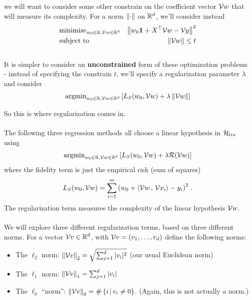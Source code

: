     we will want to consider some other constrain on the coefficient vector
    $\mathcal{V}{w}$ that will measure its complexity. For a norm $\left\| \cdot\right\|$ on
    $\mathbb{R}^d$, we'll consider instead 
    \begin{eqnarray*}
  & \text{minimize}_{w_0\in\mathbb{R},\mathcal{V}{w}\in\mathbb{R}^{d}}   &  \left\|   w_0\mathbf{1} + X^{\top}\mathcal{V}{w} -\mathcal{V}{y}  \right\|^2 \\
      & \text{subject to} &  \left\| \mathcal{V}{w}\right\| \leq t
    \end{eqnarray*}
~\\
    It is simpler to consider an {\bf unconstrained}  form of these optimization
    problems - instead of specifying the constrain $t$, we'll specify a
    regularization parameter $\lambda$ and consider
\[
     \text{argmin}_{w_0\in\mathbb{R},\mathcal{V}{w}\in\mathbb{R}^{d}} \left[L_S(w_0,\mathcal{V}{w})+  \lambda
     \left\| \mathcal{V}{w}\right\| \right]
\]


    So this is where regularization comes in.
\\~\\
        The following three regression methods all choose a linear hypothesis in
    $\mathcal{H}_{lin}$ using
\[
  \text{argmin}_{w_0\in\mathbb{R},\mathcal{V}{w}\in\mathbb{R}^{d}} \left[L_S(w_0,\mathcal{V}{w})+  \lambda
  \mathcal{R}(\mathcal{V}{w}) \right]
\]
where the fidelity term is just the empirical risk (sum of squares)
\[
  L_S(w_0,\mathcal{V}{w}) = \sum_{i=1}^m \left( w_0 + {\left\langle \mathcal{V}{w}\,,\,\mathcal{V}{x}_i \right\rangle} -y_i \right)^2\,.
\]
The regularization term measures the complexity of the linear hypothesis $\mathcal{V}{w}$. 
\\~\\
We will explore three different regularization terms, based on three different
norms. For a vector $\mathcal{V}{v}\in\mathbb{R}^d$, with $\mathcal{V}{v}=(v_1,\ldots,v_d)$ 
define the following norms:

\begin{itemize}
  \item The $\ell_2$ norm: $\left\| \mathcal{V}{v}\right\|_2 = \sqrt{\sum_{j=1}^d |v_i|^2}$ (our
    usual Euclidean norm)
  \item The $\ell_1$ norm: $\left\| \mathcal{V}{v}\right\|_1 = \sum_{j=1}^d |v_i|$
  \item The $\ell_0$ ``norm'':  $\left\| \mathcal{V}{v}\right\|_0 = \#\left\{ i\,|\, v_i\neq 0
    \right\}$. (Again, this is not actually a norm.)
\end{itemize}


